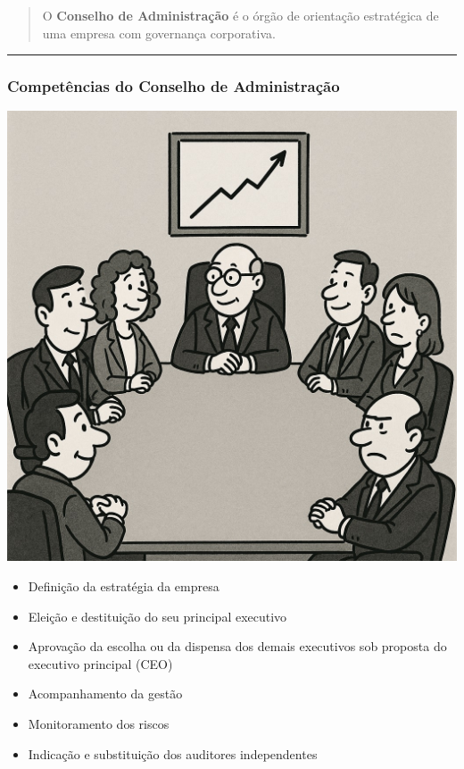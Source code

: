 \documentclass[
]{book}
\providecommand{\tightlist}{%
  \setlength{\itemsep}{0pt}\setlength{\parskip}{0pt}}
\begin{document}
\begin{quote}
O \textbf{Conselho de Administração} é o órgão de orientação estratégica de uma empresa com governança corporativa.
\end{quote}

\begin{center}\rule{0.5\linewidth}{0.5pt}\end{center}

\subsubsection{Competências do Conselho de Administração}\label{competuxeancias-do-conselho-de-administrauxe7uxe3o}

\includegraphics{images/04-2025-08-26_27/01-conselho_administrativo.jpg}

\begin{itemize}
\tightlist
\item
  Definição da estratégia da empresa\\
\item
  Eleição e destituição do seu principal executivo\\
\item
  Aprovação da escolha ou da dispensa dos demais executivos sob proposta do executivo principal (CEO)\\
\item
  Acompanhamento da gestão\\
\item
  Monitoramento dos riscos\\
\item
  Indicação e substituição dos auditores independentes
\end{itemize}
\end{document}
